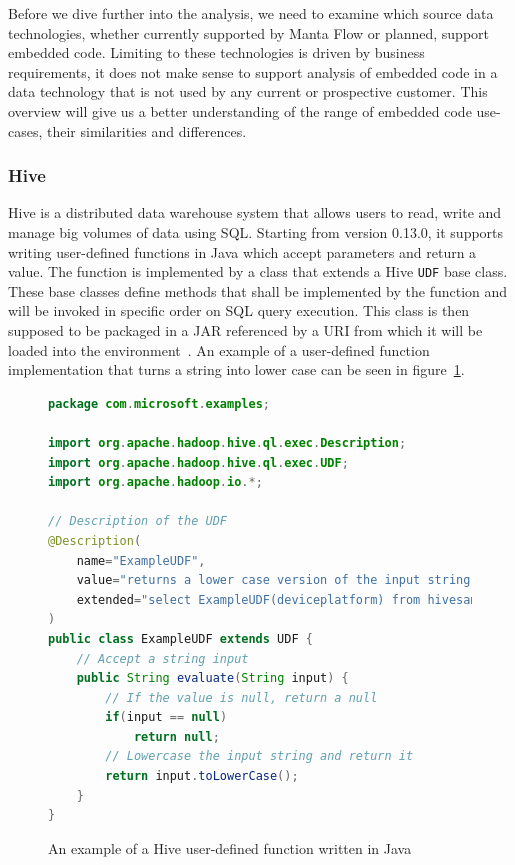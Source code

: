 Before we dive further into the analysis, we need to examine which source data technologies, whether currently supported by Manta Flow or planned, support embedded code. Limiting to these technologies is driven by business requirements, it does not make sense to support analysis of embedded code in a data technology that is not used by any current or prospective customer. This overview will give us a better understanding of the range of embedded code use-cases, their similarities and differences.

\subsubsection{Hive}
Hive is a distributed data warehouse system that allows users to read, write and manage big volumes of data using SQL. Starting from version 0.13.0, it supports writing user-defined functions in Java which accept parameters and return a value. The function is implemented by a class that extends a Hive \texttt{UDF} base class. These base classes define methods that shall be implemented by the function and will be invoked in specific order on SQL query execution. This class is then supposed to be packaged in a JAR referenced by a URI from which it will be loaded into the environment~\cite{hive}. An example of a user-defined function implementation that turns a string into lower case can be seen in figure~\ref{fig:hiveScript}.

\begin{figure}[ht]
\begin{lstlisting}[language=Java]
package com.microsoft.examples;

import org.apache.hadoop.hive.ql.exec.Description;
import org.apache.hadoop.hive.ql.exec.UDF;
import org.apache.hadoop.io.*;

// Description of the UDF
@Description(
    name="ExampleUDF",
    value="returns a lower case version of the input string.",
    extended="select ExampleUDF(deviceplatform) from hivesampletable limit 10;"
)
public class ExampleUDF extends UDF {
    // Accept a string input
    public String evaluate(String input) {
        // If the value is null, return a null
        if(input == null)
            return null;
        // Lowercase the input string and return it
        return input.toLowerCase();
    }
}
\end{lstlisting}
\caption{An example of a Hive user-defined function written in Java~\cite{hiveudfexample}}
\label{fig:hiveScript}
\end{figure}

